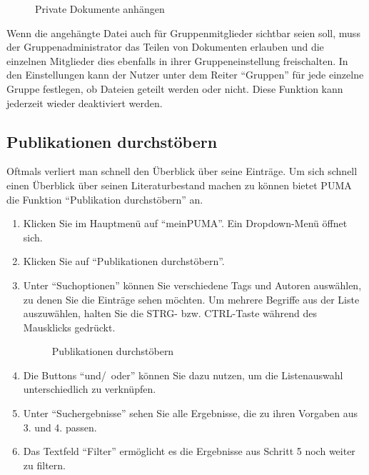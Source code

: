 \begin{description}
\begin{figure}[h!]
 \caption{Private Dokumente anhängen}
 \label{figure028}
\end{figure}
Wenn die angehängte Datei auch für Gruppenmitglieder sichtbar seien soll, muss der  Gruppenadministrator das Teilen von Dokumenten erlauben
und die einzelnen Mitglieder dies ebenfalls in ihrer Gruppeneinstellung freischalten. In den Einstellungen kann der Nutzer unter dem Reiter \enquote{Gruppen} für jede einzelne Gruppe festlegen, ob Dateien geteilt werden oder nicht. Diese Funktion kann jederzeit wieder deaktiviert werden.
\subsection{Publikationen durchstöbern}
Oftmals verliert man schnell den Überblick über seine Einträge. Um sich schnell einen Überblick über seinen Literaturbestand machen zu können bietet PUMA die Funktion \enquote{Publikation durchstöbern} an. 
\begin{enumerate}
    \item Klicken Sie im Hauptmenü auf \enquote{meinPUMA}. Ein Dropdown-Menü öffnet sich.
    \item Klicken Sie auf \enquote{Publikationen durchstöbern}.
    \item Unter \enquote{Suchoptionen} können Sie verschiedene Tags und Autoren auswählen, zu denen Sie die Einträge sehen möchten. Um mehrere Begriffe aus der Liste auszuwählen, halten Sie die STRG- bzw. CTRL-Taste während des Mausklicks gedrückt.
\begin{figure}[h!]
 \centering
 \caption{Publikationen durchstöbern}
 \label{figure029}
\end{figure}
    \item Die Buttons \enquote{und/~oder} können Sie dazu nutzen, um die Listenauswahl unterschiedlich zu verknüpfen. 
    \item Unter \enquote{Suchergebnisse} sehen Sie alle Ergebnisse, die zu ihren Vorgaben aus 3. und 4. passen.
    \item Das Textfeld \enquote{Filter} ermöglicht es die Ergebnisse aus Schritt 5 noch weiter zu filtern.
\end{enumerate}

\end{description}
